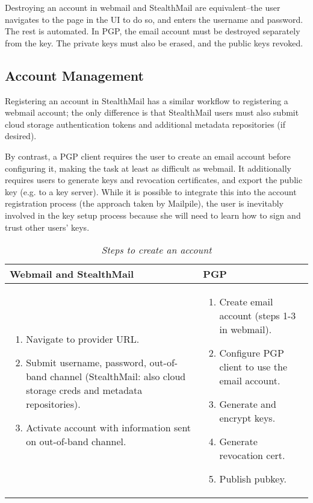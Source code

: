 Destroying an account in webmail and StealthMail are equivalent--the user navigates to the page in the UI to do so, and enters the username and password.  The rest is automated.  In PGP, the email account must be destroyed separately from the key.  The private keys must also be erased, and the public keys revoked.

\subsection{Account Management}
Registering an account in StealthMail has a similar workflow to registering a webmail account; the only difference is that StealthMail users must also submit cloud storage authentication tokens and additional metadata repositories (if desired).

By contrast, a PGP client requires the user to create an email account before configuring it, making the task at least as difficult as webmail.  It additionally requires users to generate keys and revocation certificates, and export the public key (e.g. to a key server).  While it is possible to integrate this into the account registration process (the approach taken by Mailpile), the user is inevitably involved in the key setup process because she will need to learn how to sign and trust other users’ keys. 

\begin{table}[ht!]
\begin{tabular}{ | L{3.5cm} | L{3.5cm} |}
\hline
\textbf{Webmail and StealthMail} & \textbf{PGP} \\
\hline
\vspace{-3mm}
\begin{enumerate}
  \item{Navigate to provider URL.}
  \item{Submit username, password, out-of-band channel (StealthMail: also cloud storage creds and metadata repositories).} 
  \item{Activate account with information sent on out-of-band channel.}
\end{enumerate} 
\vspace{-\topsep}&

\vspace{-3mm}
\begin{enumerate}
  \item{Create email account (steps 1-3 in webmail).}
  \item{Configure PGP client to use the email account.}
  \item{Generate and encrypt keys.}
  \item{Generate revocation cert.}
  \item{Publish pubkey.}
\end{enumerate} 
\vspace{-\topsep}\\

\hline
\end{tabular}
\caption{\it Steps to create an account}
\label{tab:account-creation}
\end{table}



